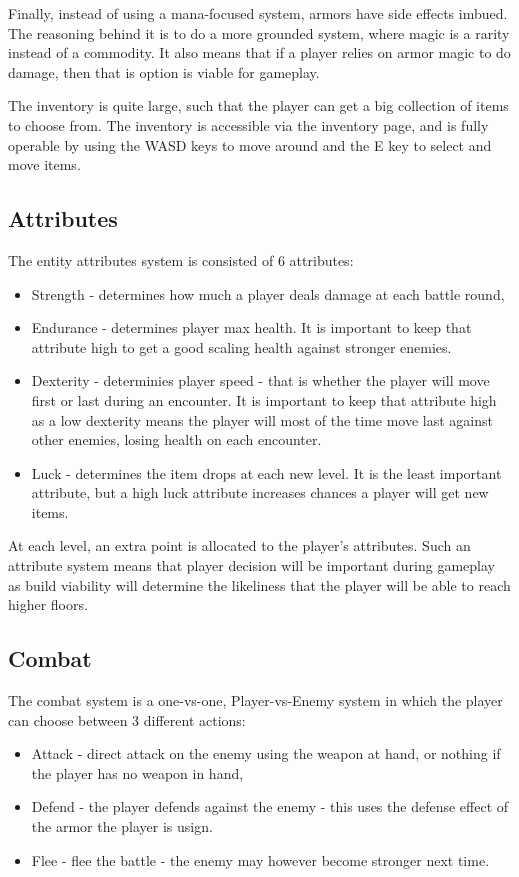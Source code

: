 \documentclass[11pt]{article}
\begin{document}
Finally, instead of using a mana-focused system, armors have side effects imbued. The reasoning behind it is to do a more
grounded system, where magic is a rarity instead of a commodity. It also means that if a player relies on armor magic to do damage, then that is option is viable for gameplay.

The inventory is quite large, such that the player can get a big collection of items to choose from. The inventory is
accessible via the inventory page, and is fully operable by using the WASD keys to move around and the E key to select
and move items.

\subsection{Attributes}
\label{sec:orgb6b545d}
The entity attributes system is consisted of 6 attributes:
\begin{itemize}
\item Strength - determines how much a player deals damage at each battle round,
\item Endurance - determines player max health. It is important to keep that attribute high to get a good scaling health
against stronger enemies.
\item Dexterity - determinies player speed - that is whether the player will move first or last during an encounter. It
is important to keep that attribute high as a low dexterity means the player will most of the time move last against
other enemies, losing health on each encounter.
\item Luck - determines the item drops at each new level. It is the least important attribute, but a high luck attribute
increases chances a player will get new items.
\end{itemize}

At each level, an extra point is allocated to the player's attributes.
Such an attribute system means that player decision will be important during gameplay as
build viability will determine the likeliness that the player will be able to reach higher floors.

\subsection{Combat}
\label{sec:org08e1e92}
The combat system is a one-vs-one, Player-vs-Enemy system in which the player can choose between 3 different actions:
\begin{itemize}
\item Attack - direct attack on the enemy using the weapon at hand, or nothing if the player has no weapon in hand,
\item Defend - the player defends against the enemy - this uses the defense effect of the armor the player is usign.
\item Flee - flee the battle - the enemy may however become stronger next time.
\end{itemize}
\end{document}
